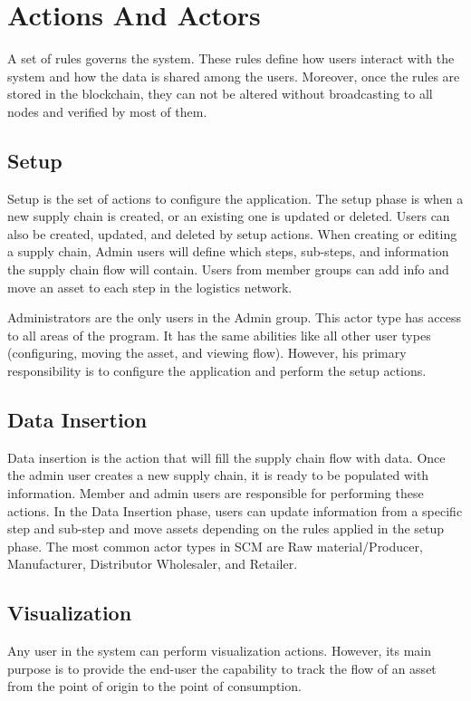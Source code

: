 \section{Actions And Actors}\label{sec:actionsAndActors}

A set of rules governs the system. These rules define how users interact with the system and how the data is shared among the users. Moreover, once the rules are stored in the blockchain, they can not be altered without broadcasting to all nodes and verified by most of them.

\subsection{Setup}\label{sec:Setup}
Setup is the set of actions to configure the application. The setup phase is when a new supply chain is created, or an existing one is updated or deleted. Users can also be created, updated, and deleted by setup actions. When creating or editing a supply chain, Admin users will define which steps, sub-steps, and information the supply chain flow will contain. Users from member groups can add info and move an asset to each step in the logistics network.

Administrators are the only users in the Admin group. This actor type has access to all areas of the program. It has the same abilities like all other user types (configuring, moving the asset, and viewing flow). However, his primary responsibility is to configure the application and perform the setup actions.



\subsection{Data Insertion}\label{sec:DataInsertion}

Data insertion is the action that will fill the supply chain flow with data. Once the admin user creates a new supply chain, it is ready to be populated with information. Member and admin users are responsible for performing these actions. In the Data Insertion phase, users can update information from a specific step and sub-step and move assets depending on the rules applied in the setup phase. The most common actor types in SCM are Raw material/Producer, Manufacturer, Distributor Wholesaler, and Retailer.


\subsection{Visualization}\label{sec:Visualization}

Any user in the system can perform visualization actions. However, its main purpose is to provide the end-user the capability to track the flow of an asset from the point of origin to the point of consumption.